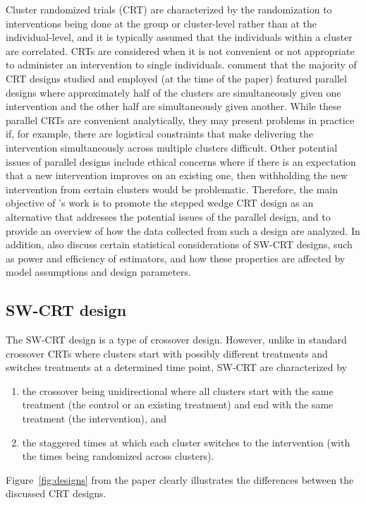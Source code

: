\documentclass[10pt]{article}
\begin{document}
Cluster randomized trials (CRT) are characterized by the randomization to interventions being done at the group or cluster-level rather than at the individual-level, and it is typically assumed that the individuals within a cluster are correlated. CRTs are considered when it is not convenient or not appropriate to administer an intervention to single individuals. \textcite{Hussey:2007} comment that the majority of CRT designs studied and employed (at the time of the paper) featured parallel designs where approximately half of the clusters are simultaneously given one intervention and the other half are simultaneously given another. While these parallel CRTs are convenient analytically, they may present problems in practice if, for example, there are logistical constraints that make delivering the intervention simultaneously across multiple clusters difficult. Other potential issues of parallel designs include ethical concerns where if there is an expectation that a new intervention improves on an existing one, then withholding the new intervention from certain clusters would be problematic. Therefore, the main objective of \citeauthor{Hussey:2007}'s work is to promote the stepped wedge CRT design as an alternative that addresses the potential issues of the parallel design, and to provide an overview of how the data collected from such a design are analyzed. In addition, \citeauthor{Hussey:2007} also discuss certain statistical considerations of SW-CRT designs, such as power and efficiency of estimators, and how these properties are affected by model assumptions and design parameters.

\subsection{SW-CRT design}

The SW-CRT design is a type of crossover design. However, unlike in standard crossover CRTs where clusters start with possibly different treatments and switches treatments at a determined time point, SW-CRT are characterized by
\begin{enumerate}

\item
the crossover being unidirectional where all clusters start with the same treatment (the control or an existing treatment) and end with the same treatment (the intervention), and

\item
the staggered times at which each cluster switches to the intervention (with the times being randomized across clusters).

\end{enumerate}
Figure~\ref{fig:designs} from the paper clearly illustrates the differences between the discussed CRT designs.
\end{document}
